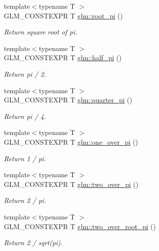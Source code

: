 \begin{DoxyCompactItemize}
{\footnotesize template$<$typename T $>$ }\\G\-L\-M\-\_\-\-C\-O\-N\-S\-T\-E\-X\-P\-R T \hyperlink{group__gtc__constants_gab330534be451fd5267622fb3fd246c3d}{glm\-::root\-\_\-pi} ()
\begin{DoxyCompactList}\small\item\em Return square root of pi. \end{DoxyCompactList}\item 
{\footnotesize template$<$typename T $>$ }\\G\-L\-M\-\_\-\-C\-O\-N\-S\-T\-E\-X\-P\-R T \hyperlink{group__gtc__constants_ga8a72b0fbaa530016ccdfd28529cda87d}{glm\-::half\-\_\-pi} ()
\begin{DoxyCompactList}\small\item\em Return pi / 2. \end{DoxyCompactList}\item 
{\footnotesize template$<$typename T $>$ }\\G\-L\-M\-\_\-\-C\-O\-N\-S\-T\-E\-X\-P\-R T \hyperlink{group__gtc__constants_gacf1caeb147205714372a562a15b140f8}{glm\-::quarter\-\_\-pi} ()
\begin{DoxyCompactList}\small\item\em Return pi / 4. \end{DoxyCompactList}\item 
{\footnotesize template$<$typename T $>$ }\\G\-L\-M\-\_\-\-C\-O\-N\-S\-T\-E\-X\-P\-R T \hyperlink{group__gtc__constants_ga0d476bfe1e72071895ece4c4b9e78a47}{glm\-::one\-\_\-over\-\_\-pi} ()
\begin{DoxyCompactList}\small\item\em Return 1 / pi. \end{DoxyCompactList}\item 
{\footnotesize template$<$typename T $>$ }\\G\-L\-M\-\_\-\-C\-O\-N\-S\-T\-E\-X\-P\-R T \hyperlink{group__gtc__constants_ga579959e61ef879efbe7e8646b2d9c222}{glm\-::two\-\_\-over\-\_\-pi} ()
\begin{DoxyCompactList}\small\item\em Return 2 / pi. \end{DoxyCompactList}\item 
{\footnotesize template$<$typename T $>$ }\\G\-L\-M\-\_\-\-C\-O\-N\-S\-T\-E\-X\-P\-R T \hyperlink{group__gtc__constants_ga31940e5cdb5cb1d8852548db573d43f9}{glm\-::two\-\_\-over\-\_\-root\-\_\-pi} ()
\begin{DoxyCompactList}\small\item\em Return 2 / sqrt(pi). \end{DoxyCompactList}\item 

\end{DoxyCompactItemize}
